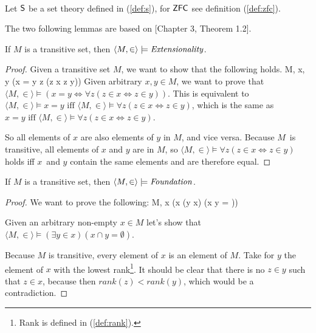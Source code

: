 \

Let $\sf{S}$ be a set theory defined in (\ref{def:s}), for $\sf{ZFC}$ see definition (\ref{def:zfc}).


The two following lemmas are based on \cite{DrakeBook}[Chapter 3, Theorem 1.2].
\begin{lemma}\label{lemma:extensionality_in_transitive} %
If $M$ is a transitive set, then $\langle M, \in \rangle \models \mbox{\emph{Extensionality}}$.
\end{lemma}

\begin{proof}
Given a transitive set $M$, we want to show that the following holds.
\beq
\langle M, \in \rangle \models \forall x, y (x = y \iff \forall z (z \in x \iff z \in y))
\eeq %
Given arbitrary $x, y \in M$, we want to prove that $\langle M, \in \rangle \models (x = y \iff \forall z (z \in x \iff z \in y))$.
This is equivalent to %
$\langle M, \in \rangle \models x = y \mbox{ iff } \langle M, \in \rangle \models \forall z(z \in x \iff z \in y)$, 
which is the same as $x = y \mbox{ iff } \langle M, \in \rangle \models \forall z(z \in x \iff z \in y)$.

So all elements of $x$ are also elements of $y$ in $M$, and vice versa. Because $M$ is transitive, all elements of $x$ and $y$ are in $M$, so $\langle M, \in \rangle \models \forall z(z \in x \iff z \in y)$ holds iff $x$ and $y$ contain the same elements and are therefore equal.
\end{proof}

\begin{lemma}\label{lemma:foundation_in_transitive}
If $M$ is a transitive set, then $\langle M, \in \rangle \models \mbox{\emph{Foundation}}$.
\end{lemma}

\begin{proof}
We want to prove the following:
\beq
\langle M, \in \rangle \models \forall x (x \neq \emptyset \then (\exists y \in x) (x \cap y = \emptyset))
\eeq

Given an arbitrary non-empty $x \in M$ let's show that $\langle M, \in \rangle \models (\exists y \in x) (x \cap y = \emptyset)$.

Because $M$ is transitive, every element of $x$ is an element of $M$. Take for $y$ the element of $x$ with the lowest rank\footnote{Rank is defined in (\ref{def:rank}).}. It should be clear that there is no $z \in y$ such that $z \in x$, because then $rank(z) < rank(y)$, which would be a contradiction.
\end{proof}

